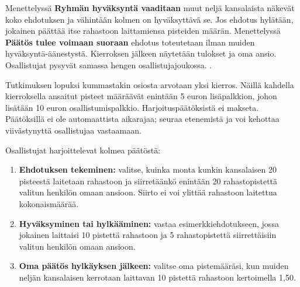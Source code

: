 Menettelyssä \textbf{Ryhmän hyväksyntä vaaditaan} muut neljä kansalaista näkevät koko ehdotuksen ja vähintään kolmen on hyväksyttävä se. Jos ehdotus hylätään, jokainen päättää itse rahastoon laittamiensa pisteiden määrän. Menettelyssä \textbf{Päätös tulee voimaan suoraan} ehdotus toteutetaan ilman muiden hyväksyntä-äänestystä. Kierroksen jälkeen näytetään tulokset ja oma ansio. Osallistujat pysyvät samassa  hengen osallistujajoukossa. .

Tutkimuksen lopuksi kummastakin osiosta arvotaan yksi kierros. Näillä kahdella kierroksella ansaitut pisteet määräävät enintään 5 euron lisäpalkkion, johon lisätään 10 euron osallistumispalkkio.  Harjoituspäätöksistä ei makseta.  Päätöksillä ei ole automaattista aikarajaa;  seuraa etenemistä ja voi kehottaa viivästynyttä osallistujaa vastaamaan.

Osallistujat harjoittelevat kolmea päätöstä:
\begin{enumerate}
  \item \textbf{Ehdotuksen tekeminen:} valitse, kuinka monta kunkin kansalaisen 20 pisteestä laitetaan rahastoon ja siirretäänkö enintään 20 rahastopistettä valitun henkilön omaan ansioon. Siirto ei voi ylittää rahastoon laitettua kokonaismäärää.
  \item \textbf{Hyväksyminen tai hylkääminen:} vastaa esimerkkiehdotukseen, jossa jokainen laittaisi 10 pistettä rahastoon ja 5 rahastopistettä siirrettäisiin valitun henkilön omaan ansioon.
  \item \textbf{Oma päätös hylkäyksen jälkeen:} valitse oma pistemääräsi, kun muiden neljän kansalaisen kerrotaan laittavan 10 pistettä rahastoon kertoimella 1,50.
\end{enumerate}

